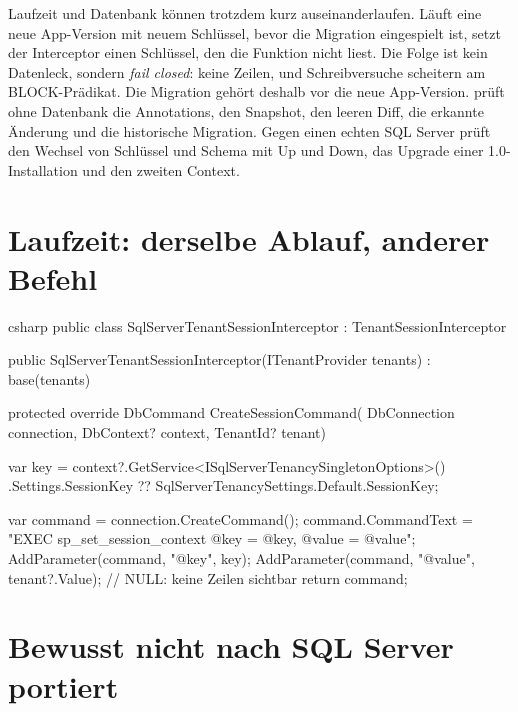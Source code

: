 Laufzeit und Datenbank können trotzdem kurz auseinanderlaufen. Läuft eine neue App-Version mit
neuem Schlüssel, bevor die Migration eingespielt ist, setzt der Interceptor einen Schlüssel, den
die Funktion nicht liest. Die Folge ist kein Datenleck, sondern \emph{fail closed}: keine Zeilen,
und Schreibversuche scheitern am BLOCK-Prädikat. Die Migration gehört deshalb vor die neue
App-Version.
prüft ohne Datenbank die Annotations, den Snapshot, den leeren Diff, die erkannte Änderung und
die historische Migration. Gegen einen echten SQL Server prüft
 den Wechsel von Schlüssel und
Schema mit Up und Down, das Upgrade einer 1.0-Installation und den zweiten Context.

\section{Laufzeit: derselbe Ablauf, anderer Befehl}

\begin{sourcecode}{csharp}
public class SqlServerTenantSessionInterceptor : TenantSessionInterceptor
{
    public SqlServerTenantSessionInterceptor(ITenantProvider tenants)
        : base(tenants)
    {
    }

    protected override DbCommand CreateSessionCommand(
        DbConnection connection, DbContext? context, TenantId? tenant)
    {
        var key = context?.GetService<ISqlServerTenancySingletonOptions>()
                      .Settings.SessionKey
                  ?? SqlServerTenancySettings.Default.SessionKey;

        var command = connection.CreateCommand();
        command.CommandText = "EXEC sp_set_session_context @key = @key, @value = @value";
        AddParameter(command, "@key", key);
        AddParameter(command, "@value", tenant?.Value);    // NULL: keine Zeilen sichtbar
        return command;
    }
}
\end{sourcecode}

\section{Bewusst nicht nach SQL Server portiert}


